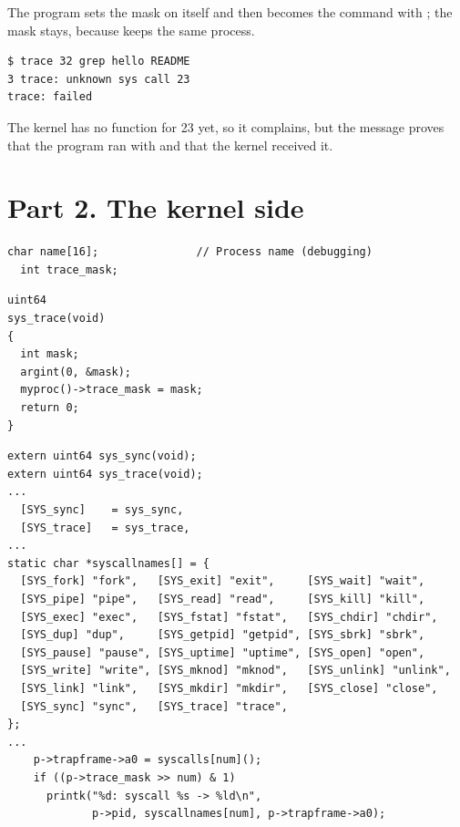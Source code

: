 \documentclass[11pt,a4paper]{article}
\begin{document}
The program sets the mask on itself and then becomes the command with ; the mask
stays, because  keeps the same process.

\begin{lstlisting}[caption={Check 1: the number reaches the kernel}]
$ trace 32 grep hello README
3 trace: unknown sys call 23
trace: failed
\end{lstlisting}

The kernel has no function for 23 yet, so it complains, but the message proves that the program
ran  with  and that the kernel received it.

\section{Part 2. The kernel side}

\begin{lstlisting}[style=ccode,firstnumber=103,caption={kernel/proc.h: a place for the mask in struct proc}]
  char name[16];               // Process name (debugging)
  int trace_mask;
\end{lstlisting}

\begin{lstlisting}[style=ccode,firstnumber=114,caption={kernel/sysproc.c: the handler}]
uint64
sys_trace(void)
{
  int mask;
  argint(0, &mask);
  myproc()->trace_mask = mask;
  return 0;
}
\end{lstlisting}

\begin{lstlisting}[style=ccode,caption={kernel/syscall.c: the table entry, the names and the print}]
extern uint64 sys_sync(void);
extern uint64 sys_trace(void);
...
  [SYS_sync]    = sys_sync,
  [SYS_trace]   = sys_trace,
...
static char *syscallnames[] = {
  [SYS_fork] "fork",   [SYS_exit] "exit",     [SYS_wait] "wait",
  [SYS_pipe] "pipe",   [SYS_read] "read",     [SYS_kill] "kill",
  [SYS_exec] "exec",   [SYS_fstat] "fstat",   [SYS_chdir] "chdir",
  [SYS_dup] "dup",     [SYS_getpid] "getpid", [SYS_sbrk] "sbrk",
  [SYS_pause] "pause", [SYS_uptime] "uptime", [SYS_open] "open",
  [SYS_write] "write", [SYS_mknod] "mknod",   [SYS_unlink] "unlink",
  [SYS_link] "link",   [SYS_mkdir] "mkdir",   [SYS_close] "close",
  [SYS_sync] "sync",   [SYS_trace] "trace",
};
...
    p->trapframe->a0 = syscalls[num]();
    if ((p->trace_mask >> num) & 1)
      printk("%d: syscall %s -> %ld\n",
             p->pid, syscallnames[num], p->trapframe->a0);
\end{lstlisting}
\end{document}
